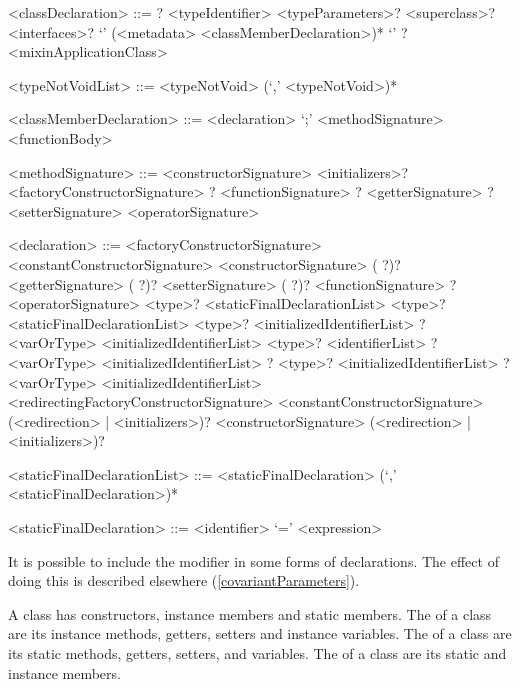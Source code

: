 \documentclass[makeidx]{article}
\begin{document}
\begin{grammar}
<classDeclaration> ::=
  \ABSTRACT? \CLASS{} <typeIdentifier> <typeParameters>?
  \gnewline{} <superclass>? <interfaces>?
  \gnewline{} `{' (<metadata> <classMemberDeclaration>)* `}'
  \alt \ABSTRACT? \CLASS{} <mixinApplicationClass>

<typeNotVoidList> ::= <typeNotVoid> (`,' <typeNotVoid>)*

<classMemberDeclaration> ::= <declaration> `;'
  \alt <methodSignature> <functionBody>

<methodSignature> ::= <constructorSignature> <initializers>?
  \alt <factoryConstructorSignature>
  \alt \STATIC? <functionSignature>
  \alt \STATIC? <getterSignature>
  \alt \STATIC? <setterSignature>
  \alt <operatorSignature>

<declaration> ::= \EXTERNAL{} <factoryConstructorSignature>
  \alt \EXTERNAL{} <constantConstructorSignature>
  \alt \EXTERNAL{} <constructorSignature>
  \alt (\EXTERNAL{} \STATIC?)? <getterSignature>
  \alt (\EXTERNAL{} \STATIC?)? <setterSignature>
  \alt (\EXTERNAL{} \STATIC?)? <functionSignature>
  \alt \EXTERNAL? <operatorSignature>
  \alt \STATIC{} \CONST{} <type>? <staticFinalDeclarationList>
  \alt \STATIC{} \FINAL{} <type>? <staticFinalDeclarationList>
  \alt \STATIC{} \LATE{} \FINAL{} <type>? <initializedIdentifierList>
  \alt \STATIC{} \LATE? <varOrType> <initializedIdentifierList>
  \alt \COVARIANT{} \LATE{} \FINAL{} <type>? <identifierList>
  \alt \COVARIANT{} \LATE? <varOrType> <initializedIdentifierList>
  \alt \LATE? \FINAL{} <type>? <initializedIdentifierList>
  \alt \LATE? <varOrType> <initializedIdentifierList>
  \alt <redirectingFactoryConstructorSignature>
  \alt <constantConstructorSignature> (<redirection> | <initializers>)?
  \alt <constructorSignature> (<redirection> | <initializers>)?

<staticFinalDeclarationList> ::= \gnewline{}
  <staticFinalDeclaration> (`,' <staticFinalDeclaration>)*

<staticFinalDeclaration> ::= <identifier> `=' <expression>
\end{grammar}

\LMHash{}%
It is possible to include the modifier \COVARIANT{}
in some forms of declarations.
The effect of doing this is described elsewhere
(\ref{covariantParameters}).

\LMHash{}%
A class has constructors, instance members and static members.
The  of a class
are its instance methods, getters, setters and instance variables.
The  of a class
are its static methods, getters, setters, and variables.
The  of a class
are its static and instance members.
\end{document}
